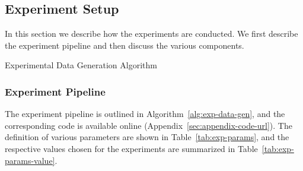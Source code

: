 \documentclass[twoside,11pt]{article}
\begin{document}
\subsection{Experiment Setup}
In this section we describe how the experiments are conducted.
We first describe the experiment pipeline and then discuss the various components.

\begin{algorithm}[htb!]
  \begin{algorithmic}[1]
        \EndFor

      \EndFor
    \EndFor
  \end{algorithmic}
  \caption{Experimental Data Generation Algorithm}
  \label{alg:exp-data-gen}
\end{algorithm}

\subsubsection{Experiment Pipeline}
The experiment pipeline is outlined in Algorithm~\ref{alg:exp-data-gen}, and the corresponding code is available online (Appendix~\ref{sec:appendix-code-url}).
The definition of various parameters are shown in Table~\ref{tab:exp-params}, and the respective values chosen for the experiments are summarized in Table~\ref{tab:exp-params-value}.
\end{document}
